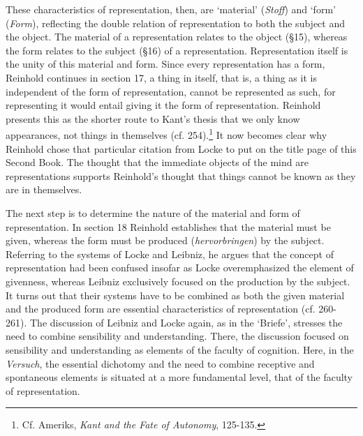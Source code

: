  These characteristics of representation, then, are `material' (\textit{Stoff}) and `form' (\textit{Form}), reflecting the double relation of representation to both the subject and the object. The material of a representation relates to the object (\S  15), whereas the form relates to the subject (\S  16) of a representation. Representation itself is the unity of this material and form. Since every representation has a form, Reinhold continues in section 17, a thing in itself, that is, a thing as it is independent of the form of representation, cannot be represented as such, for representing it would entail giving it the form of representation. Reinhold presents this as the shorter route to Kant's thesis that we only know appearances, not things in themselves (cf. 254).\footnote{ Cf. Ameriks, \textit{Kant and the Fate of Autonomy}, 125{-}135. } It now becomes clear why Reinhold chose that particular citation from Locke to put on the title page of this Second Book. The thought that the immediate objects of the mind are representations supports Reinhold's thought that things cannot be known as they are in themselves. 

The next step is to determine the nature of the material and form of representation. In section 18 Reinhold establishes that the material must be given, whereas the form must be produced (\textit{hervorbringen}) by the subject. Referring to the systems of Locke and Leibniz, he argues that the concept of representation had been confused insofar as Locke overemphasized the element of givenness, whereas Leibniz exclusively focused on the production by the subject. It turns out that their systems have to be combined as both the given material and the produced form are essential characteristics of representation (cf. 260{-}261). The discussion of Leibniz and Locke again, as in the `Briefe', stresses the need to combine sensibility and understanding. There, the discussion focused on sensibility and understanding as elements of the faculty of cognition. Here, in the \textit{Versuch}, the essential dichotomy and the need to combine receptive and spontaneous elements is situated at a more fundamental level, that of the faculty of representation. 


